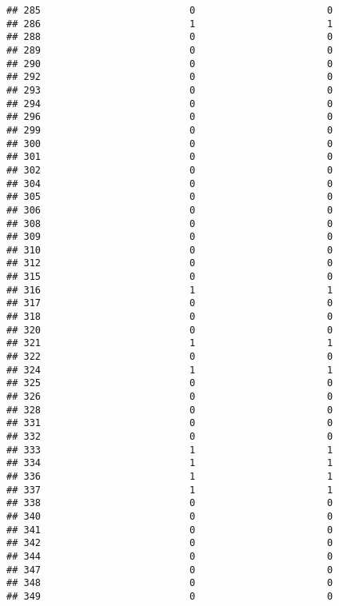 \documentclass[
]{article}
\begin{document}
\begin{verbatim}
## 285                          0                       0
## 286                          1                       1
## 288                          0                       0
## 289                          0                       0
## 290                          0                       0
## 292                          0                       0
## 293                          0                       0
## 294                          0                       0
## 296                          0                       0
## 299                          0                       0
## 300                          0                       0
## 301                          0                       0
## 302                          0                       0
## 304                          0                       0
## 305                          0                       0
## 306                          0                       0
## 308                          0                       0
## 309                          0                       0
## 310                          0                       0
## 312                          0                       0
## 315                          0                       0
## 316                          1                       1
## 317                          0                       0
## 318                          0                       0
## 320                          0                       0
## 321                          1                       1
## 322                          0                       0
## 324                          1                       1
## 325                          0                       0
## 326                          0                       0
## 328                          0                       0
## 331                          0                       0
## 332                          0                       0
## 333                          1                       1
## 334                          1                       1
## 336                          1                       1
## 337                          1                       1
## 338                          0                       0
## 340                          0                       0
## 341                          0                       0
## 342                          0                       0
## 344                          0                       0
## 347                          0                       0
## 348                          0                       0
## 349                          0                       0

\end{verbatim}
\end{document}
